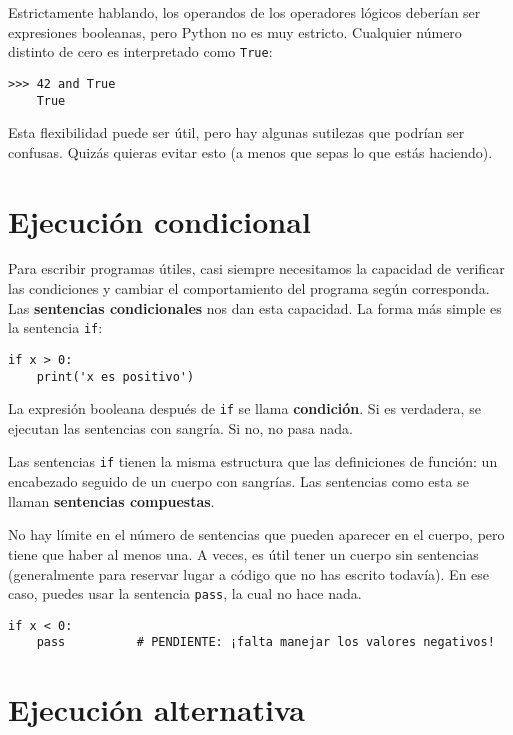 \documentclass[10pt]{book}
\begin{document}
Estrictamente hablando, los operandos de los operadores lógicos deberían ser
expresiones booleanas, pero Python no es muy estricto.
Cualquier número distinto de cero es interpretado como {\tt True}:

\begin{verbatim}
>>> 42 and True
    True
\end{verbatim}
%
Esta flexibilidad puede ser útil, pero hay algunas sutilezas
que podrían ser confusas.  Quizás quieras evitar esto (a menos que
sepas lo que estás haciendo).


\section{Ejecución condicional}
\label{conditional.execution}

Para escribir programas útiles, casi siempre necesitamos la capacidad
de verificar las condiciones y cambiar el comportamiento del programa
según corresponda.  Las {\bf sentencias condicionales} nos dan esta capacidad.  La
forma más simple es la sentencia {\tt if}:

\begin{verbatim}
if x > 0:
    print('x es positivo')
\end{verbatim}
%
La expresión booleana después de {\tt if} se
llama {\bf condición}.  Si es verdadera, se ejecutan las sentencias
con sangría.  Si no, no pasa nada.

Las sentencias {\tt if} tienen la misma estructura que las definiciones de función:
un encabezado seguido de un cuerpo con sangrías.  Las sentencias como esta se
llaman {\bf sentencias compuestas}.

No hay límite en el número de sentencias que pueden aparecer en
el cuerpo, pero tiene que haber al menos una.
A veces, es útil tener un cuerpo sin sentencias (generalmente
para reservar lugar a código que no has escrito todavía).  En ese
caso, puedes usar la sentencia {\tt pass}, la cual no hace nada.

\begin{verbatim}
if x < 0:
    pass          # PENDIENTE: ¡falta manejar los valores negativos!
\end{verbatim}
%

\section{Ejecución alternativa}
\label{alternative.execution}
\end{document}
